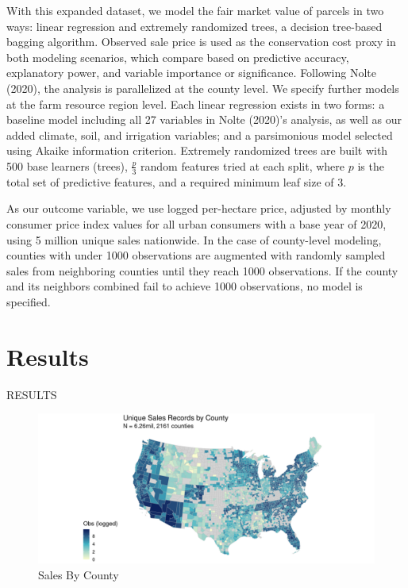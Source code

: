\documentclass[12pt]{article}
\begin{document}
With this expanded dataset, we model the fair market value of parcels in two ways: linear regression and extremely randomized trees, a decision tree-based bagging algorithm. Observed sale price is used as the conservation cost proxy in both modeling scenarios, which compare based on predictive accuracy, explanatory power, and variable importance or significance. Following Nolte (2020), the analysis is parallelized at the county level. We specify further models at the farm resource region level. Each linear regression exists in two forms: a baseline model including all 27 variables in Nolte (2020)’s analysis, as well as our added climate, soil, and irrigation variables; and a parsimonious model selected using Akaike information criterion. Extremely randomized trees are built with 500 base learners (trees), $\frac{p}{3}$ random features tried at each split, where $p$ is the total set of predictive features, and a required minimum leaf size of 3.

As our outcome variable, we use logged per-hectare price, adjusted by monthly consumer price index values for all urban consumers with a base year of 2020, using 5 million unique sales nationwide. In the case of county-level modeling, counties with under 1000 observations are augmented with randomly sampled sales from neighboring counties until they reach 1000 observations. If the county and its neighbors combined fail to achieve 1000 observations, no model is specified. 

\newpage

\section{Results}

RESULTS

\begin{figure}
    \centering
    \includegraphics[width=6in]{eda_images/countysales_log.png}
    \caption{Sales By County}
    \label{fig:sales_county}
\end{figure}
\end{document}
